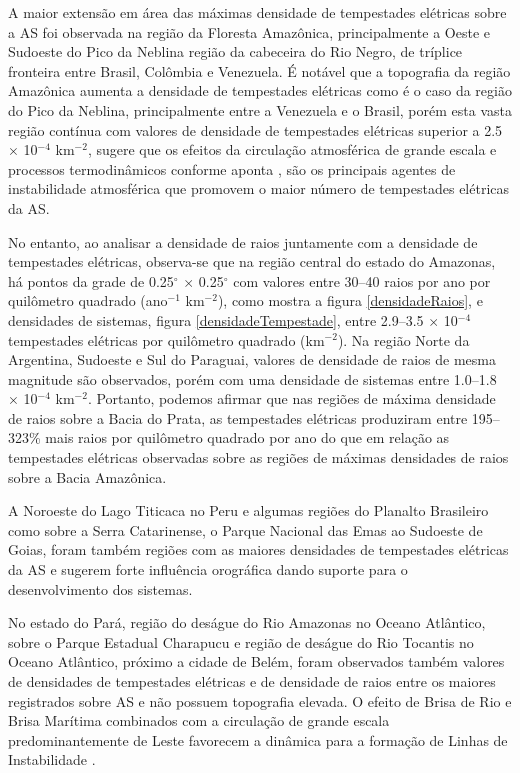 A maior extensão em área das máximas densidade de tempestades elétricas sobre a AS foi observada na região da Floresta Amazônica, principalmente a Oeste e Sudoeste do Pico da Neblina região da cabeceira do Rio Negro, de tríplice fronteira entre Brasil, Colômbia e Venezuela. É notável que a topografia da região Amazônica aumenta a densidade de tempestades elétricas como é o caso da região do Pico da Neblina, principalmente entre a Venezuela e o Brasil, porém esta vasta região contínua com valores de densidade de tempestades elétricas superior a  2.5 $\times$ 10$^{-4}$ km$^{-2}$, sugere que os efeitos da circulação atmosférica de grande escala e processos termodinâmicos conforme aponta , são os principais agentes de instabilidade atmosférica que promovem o maior número de tempestades elétricas da AS. 

No entanto, ao analisar a densidade de raios juntamente com a densidade de tempestades elétricas, observa-se que na região central do estado do Amazonas, há pontos da grade de 0.25$^{\circ}$ $\times$ 0.25$^{\circ}$ com valores entre 30--40 raios por ano por quilômetro quadrado (ano$^{-1}$ km$^{-2}$), como mostra a figura \ref{densidadeRaios},  e densidades de sistemas, figura \ref{densidadeTempestade}, entre 2.9--3.5 $\times$ 10$^{-4}$ tempestades elétricas por quilômetro quadrado (km$^{-2}$). Na região Norte da Argentina, Sudoeste e Sul do Paraguai, valores de densidade de raios de mesma magnitude são observados, porém com uma densidade de sistemas entre 1.0--1.8 $\times$ 10$^{-4}$ km$^{-2}$. Portanto, podemos afirmar que nas regiões de máxima densidade de raios sobre a Bacia do Prata, as tempestades elétricas produziram entre 195--323\% mais raios por quilômetro quadrado por ano do que em relação as tempestades elétricas observadas sobre as regiões de máximas densidades de raios sobre a Bacia Amazônica. 

A Noroeste do Lago Titicaca no Peru e algumas regiões do Planalto Brasileiro como sobre a Serra Catarinense, o Parque Nacional das Emas ao Sudoeste de Goias, foram também regiões com as maiores densidades de tempestades elétricas da AS e sugerem forte influência orográfica dando suporte para o desenvolvimento dos sistemas.

No estado do Pará, região do deságue do Rio Amazonas no Oceano Atlântico, sobre o Parque Estadual Charapucu e região de deságue do Rio Tocantis no Oceano Atlântico, próximo a cidade de Belém, foram observados também valores de densidades de tempestades elétricas e de densidade de raios entre os maiores registrados sobre AS e não possuem topografia elevada. O efeito de Brisa de Rio e Brisa Marítima combinados com a circulação de grande escala predominantemente de Leste favorecem a dinâmica para a formação de  Linhas de Instabilidade  \cite{kousky1980,cohen1995Li,Clenia2010}.


